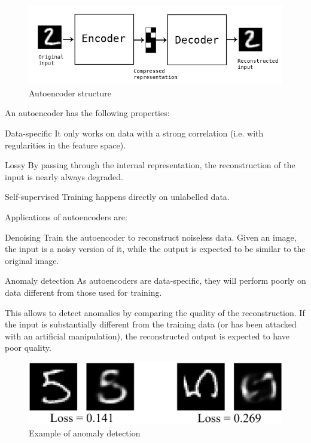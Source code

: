 \begin{figure}[H]
    \centering
    \includegraphics[width=0.5\linewidth]{./img/autoencoder.png}
    \caption{Autoencoder structure}
\end{figure}

An autoencoder has the following properties:
\begin{descriptionlist}
    \item[Data-specific] It only works on data with a strong correlation (i.e. with regularities in the feature space).
    \item[Lossy] By passing through the internal representation, the reconstruction of the input is nearly always degraded.
    \item[Self-supervised] Training happens directly on unlabelled data.
\end{descriptionlist}

Applications of autoencoders are:
\begin{descriptionlist}
    \item[Denoising] 
        Train the autoencoder to reconstruct noiseless data.
        Given an image, the input is a noisy version of it, while the output is expected to be similar to the original image.

    \item[Anomaly detection]
        As autoencoders are data-specific, they will perform poorly on data different from those used for training.

        This allows to detect anomalies by comparing the quality of the reconstruction.
        If the input is substantially different from the training data (or has been attacked with an artificial manipulation),
        the reconstructed output is expected to have poor quality.

        \begin{figure}[H]
            \centering
            \includegraphics[width=0.5\linewidth]{./img/autoencoder_anomaly.png}
            \caption{Example of anomaly detection}
        \end{figure}
\end{descriptionlist}



